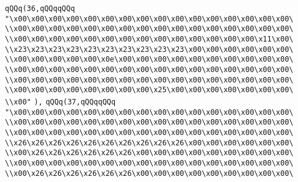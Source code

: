 \verb|qQQq(36,qQQqqQQq|\newline
\verb|"\x00\x00\x00\x00\x00\x00\x00\x00\x00\x00\x00\x00\x00\x00\x00\x00\|\newline
\verb|\\x00\x00\x00\x00\x00\x00\x00\x00\x00\x00\x00\x00\x00\x00\x00\x00\|\newline
\verb|\\x00\x00\x00\x00\x00\x00\x00\x00\x00\x00\x00\x00\x00\x00\x11\x00\|\newline
\verb|\\x23\x23\x23\x23\x23\x23\x23\x23\x23\x23\x00\x00\x00\x00\x00\x00\|\newline
\verb|\\x00\x00\x00\x00\x00\x0e\x00\x00\x00\x00\x00\x00\x00\x00\x00\x00\|\newline
\verb|\\x00\x00\x00\x00\x00\x00\x00\x00\x00\x00\x00\x00\x00\x00\x00\x00\|\newline
\verb|\\x00\x00\x00\x00\x00\x00\x00\x00\x00\x00\x00\x00\x00\x00\x00\x00\|\newline
\verb|\\x00\x00\x00\x00\x00\x00\x00\x00\x25\x00\x00\x00\x00\x00\x00\x00\|\newline
\verb|\\x00"|\newline
\verb|),|\newline
\verb|qQQq(37,qQQqqQQq|\newline
\verb|"\x00\x00\x00\x00\x00\x00\x00\x00\x00\x00\x00\x00\x00\x00\x00\x00\|\newline
\verb|\\x00\x00\x00\x00\x00\x00\x00\x00\x00\x00\x00\x00\x00\x00\x00\x00\|\newline
\verb|\\x00\x00\x00\x00\x00\x00\x00\x00\x00\x00\x00\x00\x00\x00\x00\x00\|\newline
\verb|\\x26\x26\x26\x26\x26\x26\x26\x26\x26\x26\x00\x00\x00\x00\x00\x00\|\newline
\verb|\\x00\x26\x26\x26\x26\x26\x26\x00\x00\x00\x00\x00\x00\x00\x00\x00\|\newline
\verb|\\x00\x00\x00\x00\x00\x00\x00\x00\x00\x00\x00\x00\x00\x00\x00\x00\|\newline
\verb|\\x00\x26\x26\x26\x26\x26\x26\x00\x00\x00\x00\x00\x00\x00\x00\x00\|\newline
